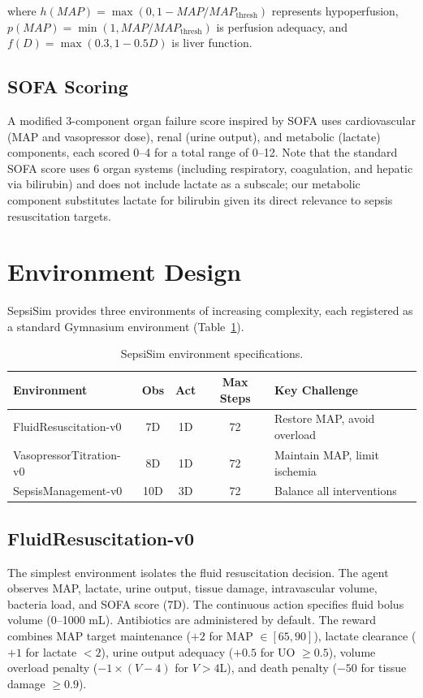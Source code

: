 \documentclass[11pt,a4paper]{article}
\begin{document}
where $h(MAP) = \max(0, 1 - MAP/MAP_{\text{thresh}})$ represents hypoperfusion, $p(MAP) = \min(1, MAP/MAP_{\text{thresh}})$ is perfusion adequacy, and $f(D) = \max(0.3, 1 - 0.5D)$ is liver function.

\subsection{SOFA Scoring}

A modified 3-component organ failure score inspired by SOFA \citep{vincent1996sofa} uses cardiovascular (MAP and vasopressor dose), renal (urine output), and metabolic (lactate) components, each scored 0--4 for a total range of 0--12. Note that the standard SOFA score uses 6 organ systems (including respiratory, coagulation, and hepatic via bilirubin) and does not include lactate as a subscale; our metabolic component substitutes lactate for bilirubin given its direct relevance to sepsis resuscitation targets.

\section{Environment Design}

SepsiSim provides three environments of increasing complexity, each registered as a standard Gymnasium environment (Table~\ref{tab:environments}).

\begin{table}[htbp]
\centering
\caption{SepsiSim environment specifications.}
\label{tab:environments}
\begin{tabular}{lcccl}
\toprule
\textbf{Environment} & \textbf{Obs} & \textbf{Act} & \textbf{Max Steps} & \textbf{Key Challenge} \\
\midrule
FluidResuscitation-v0 & 7D & 1D & 72 & Restore MAP, avoid overload \\
VasopressorTitration-v0 & 8D & 1D & 72 & Maintain MAP, limit ischemia \\
SepsisManagement-v0 & 10D & 3D & 72 & Balance all interventions \\
\bottomrule
\end{tabular}
\end{table}

\subsection{FluidResuscitation-v0}

The simplest environment isolates the fluid resuscitation decision. The agent observes MAP, lactate, urine output, tissue damage, intravascular volume, bacteria load, and SOFA score (7D). The continuous action specifies fluid bolus volume (0--1000 mL). Antibiotics are administered by default. The reward combines MAP target maintenance ($+2$ for MAP $\in [65, 90]$), lactate clearance ($+1$ for lactate $< 2$), urine output adequacy ($+0.5$ for UO $\geq 0.5$), volume overload penalty ($-1 \times (V - 4)$ for $V > 4$L), and death penalty ($-50$ for tissue damage $\geq 0.9$).
\end{document}
